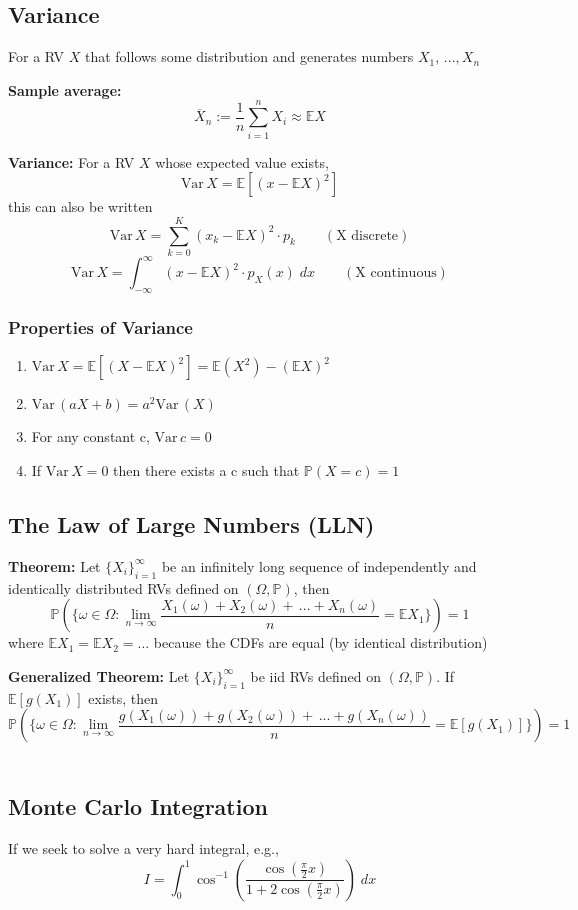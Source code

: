 \documentclass[12pt]{article}
\renewcommand{\P}{\mathbb{P}}
\newcommand{\E}{\mathbb{E}}
\newcommand{\Var}{\text{Var}\,}
\begin{document}
\subsection{Variance}
For a RV $X$ that follows some distribution and generates numbers $X_1, \, ..., X_n$

\textbf{Sample average:}
\[\overline{X}_n := \frac{1}{n} \sum_{i=1}^n X_i\approx \E X\]

\textbf{Variance:} For a RV $X$ whose expected value exists, 
\[\Var X = \E[(x - \E X)^2]\]
this can also be written 
\[\Var X = \sum_{k=0}^K (x_k - \E X)^2 \cdot p_k \qquad (\text{X discrete})\]
\[\Var X = \int_{-\infty}^{\infty} (x - \E X)^2 \cdot p_X(x)\; dx \qquad (\text{X continuous})\]

\subsubsection*{Properties of Variance}
\begin{enumerate}
    \item $\Var X = \E[(X - \E X)^2] = \E(X^2) - (\E X)^2$
    \item $\Var(aX + b) = a^2 \Var(X)$
    \item For any constant c, $\Var c = 0$
    \item If $\Var X =0$ then there exists a c such that $\P(X = c) = 1$
\end{enumerate}

\subsection{The Law of Large Numbers (LLN)}
\textbf{Theorem:} Let $\{X_i\}_{i=1}^\infty$ be an infinitely long sequence of independently and identically distributed RVs defined on $(\Omega, \P)$, then 
\[\P\left(\{\omega \in \Omega: \lim_{n\to \infty} \frac{X_1(\omega) + X_2(\omega) +\, ... + X_n(\omega)}{n} = \E X_1\}\right) = 1\]
where $\E X_1 = \E X_2 = ...$ because the CDFs are equal (by identical distribution)

\textbf{Generalized Theorem:} Let $\{X_i\}_{i=1}^\infty$ be iid RVs defined on $(\Omega, \P)$. If $\E[g(X_1)]$ exists, then 
\[\P\left(\{\omega \in \Omega: \lim_{n\to \infty} \frac{g(X_1(\omega)) + g(X_2(\omega)) +\, ... + g(X_n(\omega))}{n} = \E[g(X_1)]\}\right) = 1\]
\
\subsection{Monte Carlo Integration}
If we seek to solve a very hard integral, e.g., 
\[I = \int_0^1 \cos^{-1}\left(\frac{\cos(\frac{\pi}{2}x)}{1 + 2\cos(\frac{\pi}{2}x)}\right)\; dx\]
\end{document}
